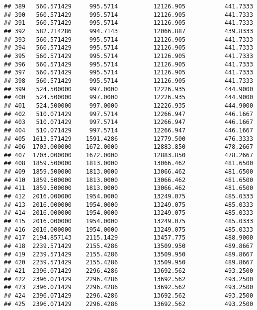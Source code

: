 \documentclass[]{article}
\begin{document}
\begin{verbatim}
## 389   560.571429     995.5714          12126.905           441.7333
## 390   560.571429     995.5714          12126.905           441.7333
## 391   560.571429     995.5714          12126.905           441.7333
## 392   582.214286     994.7143          12066.887           439.8333
## 393   560.571429     995.5714          12126.905           441.7333
## 394   560.571429     995.5714          12126.905           441.7333
## 395   560.571429     995.5714          12126.905           441.7333
## 396   560.571429     995.5714          12126.905           441.7333
## 397   560.571429     995.5714          12126.905           441.7333
## 398   560.571429     995.5714          12126.905           441.7333
## 399   524.500000     997.0000          12226.935           444.9000
## 400   524.500000     997.0000          12226.935           444.9000
## 401   524.500000     997.0000          12226.935           444.9000
## 402   510.071429     997.5714          12266.947           446.1667
## 403   510.071429     997.5714          12266.947           446.1667
## 404   510.071429     997.5714          12266.947           446.1667
## 405  1613.571429    1591.4286          12779.500           476.3333
## 406  1703.000000    1672.0000          12883.850           478.2667
## 407  1703.000000    1672.0000          12883.850           478.2667
## 408  1859.500000    1813.0000          13066.462           481.6500
## 409  1859.500000    1813.0000          13066.462           481.6500
## 410  1859.500000    1813.0000          13066.462           481.6500
## 411  1859.500000    1813.0000          13066.462           481.6500
## 412  2016.000000    1954.0000          13249.075           485.0333
## 413  2016.000000    1954.0000          13249.075           485.0333
## 414  2016.000000    1954.0000          13249.075           485.0333
## 415  2016.000000    1954.0000          13249.075           485.0333
## 416  2016.000000    1954.0000          13249.075           485.0333
## 417  2194.857143    2115.1429          13457.775           488.9000
## 418  2239.571429    2155.4286          13509.950           489.8667
## 419  2239.571429    2155.4286          13509.950           489.8667
## 420  2239.571429    2155.4286          13509.950           489.8667
## 421  2396.071429    2296.4286          13692.562           493.2500
## 422  2396.071429    2296.4286          13692.562           493.2500
## 423  2396.071429    2296.4286          13692.562           493.2500
## 424  2396.071429    2296.4286          13692.562           493.2500
## 425  2396.071429    2296.4286          13692.562           493.2500

\end{verbatim}
\end{document}
